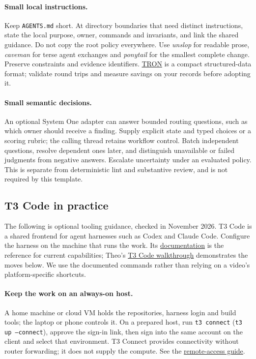 \paragraph{Small local instructions.} Keep \texttt{AGENTS.md} short. At directory boundaries that need distinct instructions, state the local purpose, owner, commands and invariants, and link the shared guidance. Do not copy the root policy everywhere. Use \emph{unslop} for readable prose, \emph{caveman} for terse agent exchanges and \emph{ponytail} for the smallest complete change. Preserve constraints and evidence identifiers. \href{https://github.com/tron-format/tron-javascript}{TRON} is a compact structured-data format; validate round trips and measure savings on your records before adopting it.

\paragraph{Small semantic decisions.} An optional System One adapter can answer bounded routing questions, such as which owner should receive a finding. Supply explicit state and typed choices or a scoring rubric; the calling thread retains workflow control. Batch independent questions, resolve dependent ones later, and distinguish unavailable or failed judgments from negative answers. Escalate uncertainty under an evaluated policy. This is separate from deterministic lint and substantive review, and is not required by this template.

\subsection{T3 Code in practice}\label{app:code:t3}
The following is optional tooling guidance, checked in November 2026. T3 Code is a shared frontend for agent harnesses such as Codex and Claude Code. Configure the harness on the machine that runs the work. Its \href{https://github.com/pingdotgg/t3code}{documentation} is the reference for current capabilities; Theo's \href{https://www.youtube.com/watch?v=uLGxb4F3SyI}{T3 Code walkthrough} demonstrates the moves below. We use the documented commands rather than relying on a video's platform-specific shortcuts.

\paragraph{Keep the work on an always-on host.} A home machine or cloud VM holds the repositories, harness login and build tools; the laptop or phone controls it. On a prepared host, run \texttt{t3 connect} (\texttt{t3 up --connect}), approve the sign-in link, then sign into the same account on the client and select that environment. T3 Connect provides connectivity without router forwarding; it does not supply the compute. See the \href{https://github.com/pingdotgg/t3code/blob/main/docs/user/remote-access.md}{remote-access guide}.

